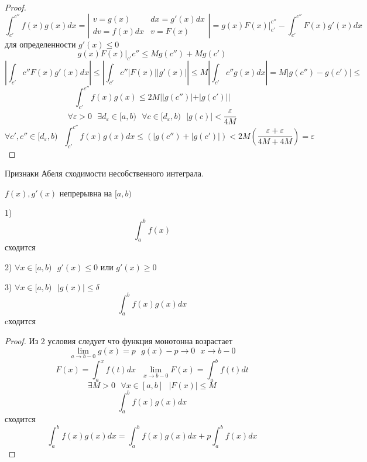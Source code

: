 \begin{proof}
  $$
  \int_{c'}^{c''} f(x)g(x)dx =
  \left|
    \begin{array}{ll}
      v = g(x)    & dx = g'(x)dx \\
      dv = f(x)dx & v = F(x)
    \end{array}
  \right|
  = g(x)F(x)|_{c'}^{c''} - \int_{c'}^{c''} F(x)g'(x)dx
  $$
  для определенности $g'(x) \le 0$
  $$
  g(x)F(x)|_{c'}{c''} \le M g(c'') + M g(c')
  $$
  $$
  \left| \int_{c'}{c''} F(x)g'(x)dx \right| \le
  \left| \int_{c'}{c''} |F(x)||g'(x)| \right| \le
  M \left| \int_{c'}{c''} g(x)dx \right| = M|g(c'') - g(c')| \le
  $$
  $$
  \int_{c'}^{c''} f(x)g(x) \le 2M||g(c'')| + |g(c')||
  $$
  $$
  \forall \varepsilon > 0 ~~~ \exists d_{\varepsilon} \in [a,b) ~~~
  \forall c \in [d_{\varepsilon}, b) ~~~ |g(c)| < \frac{\varepsilon}{4M}
  $$
  $$
  \forall c', c'' \in [d_{\varepsilon}, b) ~~~ \int_{c'}^{c''} f(x)g(x)dx \le
  (|g(c'') + |g(c')|) <
  2M \left(\frac{\varepsilon + \varepsilon}{4M + 4M}\right) = \varepsilon
  $$
\end{proof}

\begin{title}[\Large]
  Признаки Абеля сходимости несобственного интеграла.
\end{title}

\begin{theorem}
  $f(x),g'(x)$ непрерывна на $[a,b)$

  1) $$\int_a^b f(x)$$ сходится

  2) $\forall x \in [a,b) ~~~ g'(x) \le 0$ или $g'(x) \ge 0$

  3) $\forall x \in [a,b) ~~~ |g(x)| \le \delta$
  $$
  \int_a^b f(x)g(x)dx
  $$
  cходится
\end{theorem}

\begin{proof}
  Из 2 условия следует что функция монотонна возрастает
  $$
  \lim_{a \to b-0}g(x) = p ~~~ g(x) - p \to 0 ~~~ x \to b-0
  $$
  $$
  F(x) = \int_a^x f(t)dx ~~~ \lim_{x \to b-0} F(x) = \int_a^b f(t)dt
  $$
  $$
  \exists M > 0 ~~~ \forall x \in [a,b] ~~~ |F(x)| \le M
  $$
  $$
  \int_a^b f(x)g(x)dx
  $$
  сходится
  $$
  \int_a^b f(x)g(x)dx = \int_a^b f(x)g(x)dx + p\int_a^b f(x)dx
  $$
\end{proof}